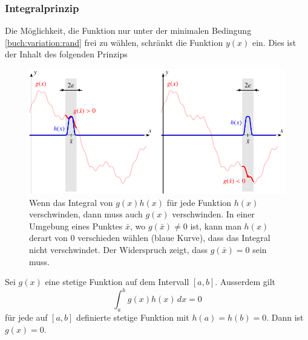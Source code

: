 \subsubsection{Integralprinzip}
%
Die Möglichkeit, die Funktion nur unter der minimalen Bedingung
\eqref{buch:variation:rand} frei zu wählen, schränkt die Funktion
$y(x)$ ein.
Dies ist der Inhalt des folgenden Prinzips
\begin{figure}
\centering
\includegraphics{chapters/30-interpolation/figures/integral.pdf}
\caption{Wenn das Integral von $g(x) h(x)$ für jede Funktion $h(x)$
verschwinden, dann muss auch $g(x)$ verschwinden.
In einer Umgebung eines Punktes $\bar{x}$, wo $g(\bar{x})\ne 0$ ist,
kann man $h(x)$ derart von $0$ verschieden wählen (blaue Kurve),
dass das Integral nicht verschwindet.
Der Widerspruch zeigt, dass $g(\bar{x})=0$ sein muss.
\label{buch:interpolation:figure:integralprinzip}}
\end{figure}

\begin{lemma}[Integralprinzip]
\label{buch:lemma:integralprinzip}
Sei $g(x)$ eine stetige Funktion auf dem Intervall $[a,b]$.
Ausserdem gilt
\[
\int_a^b g(x)  h(x)\,dx = 0
\]
für jede auf $[a,b]$ definierte stetige Funktion mit $h(a)=h(b)=0$.
Dann ist $g(x)=0$.
\end{lemma}

